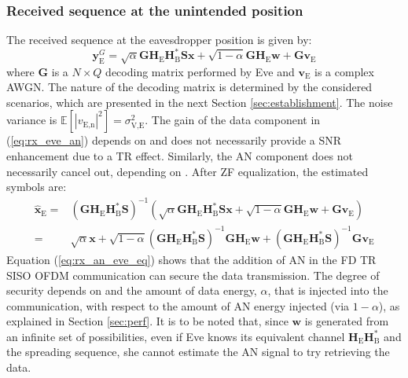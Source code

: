 \documentclass[12pt, draftclsnofoot, onecolumn]{IEEEtran}
\newcommand{\EX}[1]{\mathbb{E} \left[#1\right]}%
\newcommand{\HE}{\textbf{H}_{\text{E}}}
\newcommand{\HB}{\textbf{H}_{\text{B}}}
\newcommand{\spread}{\textbf{S}}
\newcommand{\w}{\textbf{w}}
\newcommand{\mat}[1]{\boldsymbol{\mathrm{#1}}}
\begin{document}
\subsubsection{Received sequence at the unintended position}
The received sequence at the eavesdropper position is given by:
\begin{equation}
	\textbf{y}_{\text{E}}^G = \sqrt{\alpha}  \textbf{G} \HE \HB^* \spread\textbf{x} + \sqrt{1-\alpha} \textbf{G} \HE \w + \textbf{G}  \textbf{v}_\text{E}
	\label{eq:rx_eve_an}
\end{equation}
where $\textbf{G}$ is a $N \times Q$ decoding matrix performed by Eve and $\textbf{v}_\text{E}$ is a complex AWGN. The nature of the decoding matrix is determined by the considered scenarios, which are presented in the next Section \ref{sec:establishment}. The noise variance is $\EX{|v_{\text{E,n}}|^2} = \sigma_{\text{V,E}}^2$.  The gain of the data component in (\ref{eq:rx_eve_an}) depends on \mat{G} and does not necessarily provide a SNR enhancement due to a TR effect. Similarly, the AN component does not necessarily cancel out, depending on \mat{G}. After ZF equalization, the estimated symbols are:
\begin{equation}
	\begin{split}
		\hat{\textbf{x}}_{\text{E}} =& \left(\textbf{G} \HE \HB^* \spread \right)^{-1}
		\left( \sqrt{\alpha} \textbf{G} \HE \HB^* \spread \textbf{x} +   \sqrt{1-\alpha} \textbf{G} \HE \w  +  \textbf{G}  \textbf{v}_\text{E}  \right) \\
		=& \sqrt{\alpha}\textbf{x} + \sqrt{1-\alpha} \left(\textbf{G} \HE \HB^* \spread \right)^{-1}  \textbf{G} \HE \w + \left(\textbf{G} \HE \HB^* \spread \right)^{-1}  \textbf{G} \textbf{v}_\text{E}
	\end{split}
	\label{eq:rx_an_eve_eq}
\end{equation}
Equation (\ref{eq:rx_an_eve_eq}) shows that the addition of AN in the FD TR SISO OFDM communication can secure the data transmission. The degree of security depends on \mat{G} and the amount of data energy, $\alpha$, that is injected into the communication, with respect to the amount of AN energy injected (via $1-\alpha$), as explained in Section \ref{sec:perf}. It is to be noted that, since $\w$ is generated from an infinite set of possibilities, even if Eve knows its equivalent channel $\HE\HB^*$ and the spreading sequence, she cannot estimate the AN signal  to try retrieving the data. 
\end{document}
